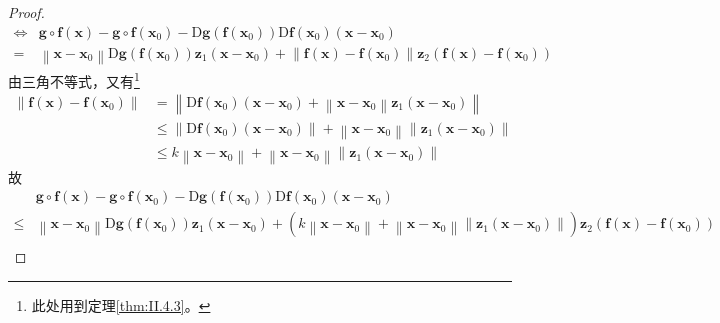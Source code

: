 \documentclass[../main.tex]{subfiles}
\begin{document}
\begin{proof}
\begin{align*}
        \Leftrightarrow & \mathbf{g}\circ\mathbf{f}\left(\mathbf{x}\right)-\mathbf{g}\circ\mathbf{f}\left(\mathbf{x}_0\right)-\mathrm{D}\mathbf{g}\left(\mathbf{f}\left(\mathbf{x}_0\right)\right)\mathrm{D}\mathbf{f}\left(\mathbf{x}_0\right)\left(\mathbf{x}-\mathbf{x}_0\right)                                                                                                     \\
        =               & \left\|\mathbf{x}-\mathbf{x}_0\right\|\mathrm{D}\mathbf{g}\left(\mathbf{f}\left(\mathbf{x}_0\right)\right)\mathbf{z}_1\left(\mathbf{x}-\mathbf{x}_0\right)+\left\|\mathbf{f}\left(\mathbf{x}\right)-\mathbf{f}\left(\mathbf{x}_0\right)\right\|\mathbf{z}_2\left(\mathbf{f}\left(\mathbf{x}\right)-\mathbf{f}\left(\mathbf{x}_0\right)\right)
    \end{align*}
    由三角不等式，又有\footnote{
        此处用到定理\ref{thm:II.4.3}。
    }
    \begin{align*}
        \left\|\mathbf{f}\left(\mathbf{x}\right)-\mathbf{f}\left(\mathbf{x}_0\right)\right\| & =\left\|\mathrm{D}\mathbf{f}\left(\mathbf{x}_0\right)\left(\mathbf{x}-\mathbf{x}_0\right)+\left\|\mathbf{x}-\mathbf{x}_0\right\|\mathbf{z}_1\left(\mathbf{x}-\mathbf{x}_0\right)\right\|                    \\
                                                                                             & \leq \left\|\mathrm{D}\mathbf{f}\left(\mathbf{x}_0\right)\left(\mathbf{x}-\mathbf{x}_0\right)\right\|+\left\|\mathbf{x}-\mathbf{x}_0\right\|\left\|\mathbf{z}_1\left(\mathbf{x}-\mathbf{x}_0\right)\right\| \\
                                                                                             & \leq k\left\|\mathbf{x}-\mathbf{x}_0\right\|+\left\|\mathbf{x}-\mathbf{x}_0\right\|\left\|\mathbf{z}_1\left(\mathbf{x}-\mathbf{x}_0\right)\right\|
    \end{align*}
    故
    \begin{align*}
             & \mathbf{g}\circ\mathbf{f}\left(\mathbf{x}\right)-\mathbf{g}\circ\mathbf{f}\left(\mathbf{x}_0\right)-\mathrm{D}\mathbf{g}\left(\mathbf{f}\left(\mathbf{x}_0\right)\right)\mathrm{D}\mathbf{f}\left(\mathbf{x}_0\right)\left(\mathbf{x}-\mathbf{x}_0\right)                                                                                                                                                           \\
        \leq & \left\|\mathbf{x}-\mathbf{x}_0\right\|\mathrm{D}\mathbf{g}\left(\mathbf{f}\left(\mathbf{x}_0\right)\right)\mathbf{z}_1\left(\mathbf{x}-\mathbf{x}_0\right)+\left(k\left\|\mathbf{x}-\mathbf{x}_0\right\|+\left\|\mathbf{x}-\mathbf{x}_0\right\|\left\|\mathbf{z}_1\left(\mathbf{x}-\mathbf{x}_0\right)\right\|\right)\mathbf{z}_2\left(\mathbf{f}\left(\mathbf{x}\right)-\mathbf{f}\left(\mathbf{x}_0\right)\right) \\

\end{align*}
\end{proof}
\end{document}
